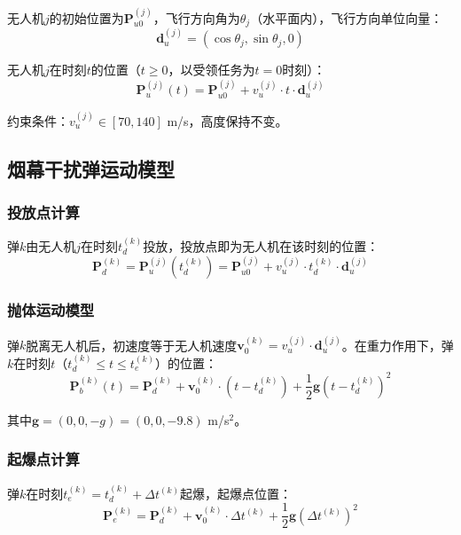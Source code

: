 \documentclass[12pt,a4paper]{article}
\newcommand{\vect}[1]{\boldsymbol{#1}}
\begin{document}
无人机$j$的初始位置为$\vect{P}_{u0}^{(j)}$，飞行方向角为$\theta_j$（水平面内），飞行方向单位向量：
\begin{equation}
    \vect{d}_u^{(j)} = (\cos\theta_j, \sin\theta_j, 0)
\end{equation}

无人机$j$在时刻$t$的位置（$t \geq 0$，以受领任务为$t = 0$时刻）：
\begin{equation}
    \vect{P}_u^{(j)}(t) = \vect{P}_{u0}^{(j)} + v_u^{(j)} \cdot t \cdot \vect{d}_u^{(j)}
    \label{eq:uav_traj}
\end{equation}

约束条件：$v_u^{(j)} \in [70, 140]$ m/s，高度保持不变。

\subsection{烟幕干扰弹运动模型}

\subsubsection{投放点计算}

弹$k$由无人机$j$在时刻$t_d^{(k)}$投放，投放点即为无人机在该时刻的位置：
\begin{equation}
    \vect{P}_d^{(k)} = \vect{P}_u^{(j)}(t_d^{(k)}) = \vect{P}_{u0}^{(j)} + v_u^{(j)} \cdot t_d^{(k)} \cdot \vect{d}_u^{(j)}
    \label{eq:drop_point}
\end{equation}

\subsubsection{抛体运动模型}

弹$k$脱离无人机后，初速度等于无人机速度$\vect{v}_0^{(k)} = v_u^{(j)} \cdot \vect{d}_u^{(j)}$。在重力作用下，弹$k$在时刻$t$（$t_d^{(k)} \leq t \leq t_e^{(k)}$）的位置：
\begin{equation}
    \vect{P}_b^{(k)}(t) = \vect{P}_d^{(k)} + \vect{v}_0^{(k)} \cdot (t - t_d^{(k)}) + \frac{1}{2} \vect{g} (t - t_d^{(k)})^2
    \label{eq:bomb_traj}
\end{equation}

其中$\vect{g} = (0, 0, -g) = (0, 0, -9.8)$ m/s$^2$。

\subsubsection{起爆点计算}

弹$k$在时刻$t_e^{(k)} = t_d^{(k)} + \Delta t^{(k)}$起爆，起爆点位置：
\begin{equation}
    \vect{P}_e^{(k)} = \vect{P}_d^{(k)} + \vect{v}_0^{(k)} \cdot \Delta t^{(k)} + \frac{1}{2} \vect{g} (\Delta t^{(k)})^2
    \label{eq:detonate_point}
\end{equation}
\end{document}
